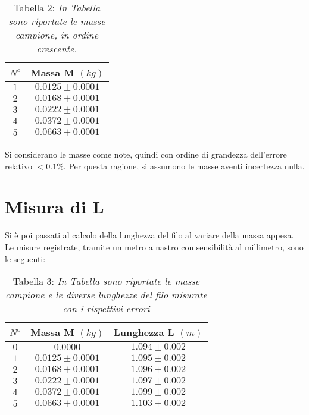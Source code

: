 \documentclass[12pt, a4paper]{article}
\begin{document}
\begin{table}[!htb]
    \centering
        \begin{tabular}{|c|c|}
            \hline
            $N^o$ &Massa M $(kg)$\\
            \hline
            $1$ & $0.0125\pm0.0001$\\
            $2$ & $0.0168\pm0.0001$\\
            $3$ & $0.0222\pm0.0001$\\
            $4$ & $0.0372\pm0.0001$\\
            $5$ & $0.0663\pm0.0001$\\
            \hline
        \end{tabular}
        \label{Tab masse}
        \caption*{Tabella 2: \textit{\footnotesize In Tabella sono riportate le masse campione, in ordine crescente.}}
        \end{table}

    Si considerano le masse come note, quindi con ordine di grandezza dell'errore relativo $<0.1\%$. Per questa ragione, si assumono le masse aventi incertezza nulla.


    
\section{Misura di L}
\label{Misura di L}
Si è poi passati al calcolo della lunghezza del filo al variare della massa appesa. Le misure registrate, tramite un metro a nastro con sensibilità al millimetro, sono le seguenti:

\begin{table}[!htb]
    \centering
        \begin{tabular}{|c|c|c|}
            \hline
            $N^o$ &Massa M $(kg)$&Lunghezza L $(m)$\\
            \hline
            $0$ & $0.0000$         &$1.094\pm0.002$\\
            $1$ & $0.0125\pm0.0001$&$1.095\pm0.002$\\
            $2$ & $0.0168\pm0.0001$&$1.096\pm0.002$\\
            $3$ & $0.0222\pm0.0001$&$1.097\pm0.002$\\
            $4$ & $0.0372\pm0.0001$&$1.099\pm0.002$\\
            $5$ & $0.0663\pm0.0001$&$1.103\pm0.002$\\
           
            \hline
        \end{tabular}
        \label{Tab Lunghezze}
        \caption*{\centering Tabella 3: \textit{\footnotesize In Tabella sono riportate le masse campione e le diverse lunghezze del filo misurate con i rispettivi errori }}
        \end{table}
\end{document}
